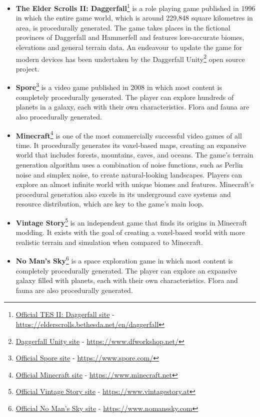 \begin{itemize}
    \item \textbf{The Elder Scrolls II: Daggerfall}\footnote{\href{https://elderscrolls.bethesda.net/en/daggerfall}{Official TES II: Daggerfall site}  -
    \url{https://elderscrolls.bethesda.net/en/daggerfall}} is a role playing game published in 1996 in which the entire game world, which is around 229,848 square kilometres in area, is procedurally generated.
    The game takes places in the fictional provinces of Daggerfall and Hammerfell and features lore-accurate biomes, elevations and general terrain data.
    An endeavour to update the game for modern devices has been undertaken by the Daggerfall Unity\footnote{\href{https://www.dfworkshop.net/}{Daggerfall Unity site} -
    \url{https://www.dfworkshop.net/}} open source project.
    \item \textbf{Spore}\footnote{\href{https://www.spore.com/}{Official Spore site} - \url{https://www.spore.com/}} is a video game published in 2008 in which most content is completely procedurally generated. 
    The player can explore hundreds of planets in a galaxy, each with their own characteristics.
    Flora and fauna are also procedurally generated.
    \item \textbf{Minecraft}\footnote{\href{https://www.minecraft.net}{Official Minecraft site}
    - \url{https://www.minecraft.net}} is one of the most commercially successful video games of all time. 
    It procedurally generates its voxel-based maps, creating an expansive world that includes forests, mountains, caves, and oceans. 
    The game's terrain generation algorithm uses a combination of noise functions, such as Perlin noise and simplex noise, to create natural-looking landscapes.
    Players can explore an almost infinite world with unique biomes and features.
    Minecraft's procedural generation also excels in its underground cave systems and resource distribution, which are key to the game's main loop. %
    \item \textbf{Vintage Story}\footnote{\href{https://www.vintagestory.at}{Official Vintage Story site} -
    \url{https://www.vintagestory.at}} is an independent game that finds its origins in Minecraft modding.
    It exists with the goal of creating a voxel-based world with more realistic terrain and simulation when compared to Minecraft.
    \item \textbf{No Man's Sky}\footnote{\href{https://www.nomanssky.com}{Official No Man's Sky site} -
    \url{https://www.nomanssky.com}} is a space exploration game in which most content is completely procedurally generated. 
    The player can explore an expansive galaxy filled with planets, each with their own characteristics.
    Flora and fauna are also procedurally generated.
\end{itemize}

